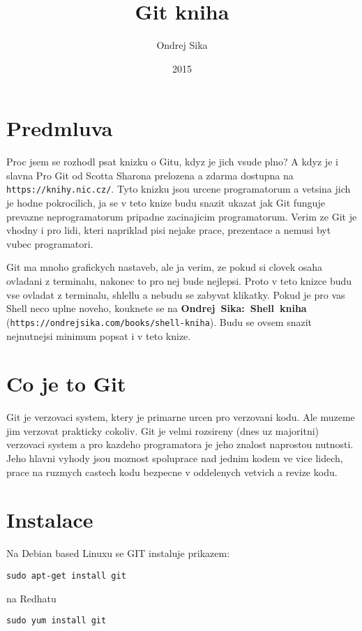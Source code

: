 \documentclass[12pt,a5paper]{article}
\title{Git kniha}
\author{Ondrej Sika}
\date{2015}
\begin{document}


\section{Predmluva}

Proc jsem se rozhodl psat knizku o Gitu, kdyz je jich vsude plno? A kdyz je i slavna Pro Git od Scotta Sharona prelozena a zdarma dostupna na \lstinline|https://knihy.nic.cz/|. Tyto knizku jsou urcene programatorum a vetsina jich je hodne pokrocilich, ja se v teto knize budu snazit ukazat jak Git funguje prevazne neprogramatorum pripadne zacinajicim programatorum. Verim ze Git je vhodny i pro lidi, kteri napriklad pisi nejake prace, prezentace a nemusi byt vubec programatori.

Git ma mnoho grafickych nastaveb, ale ja verim, ze pokud si clovek osaha ovladani z terminalu, nakonec to pro nej bude nejlepsi. Proto v teto knizce budu vse ovladat z terminalu, shlellu a nebudu se zabyvat klikatky. Pokud je pro vas Shell neco uplne noveho, kouknete se na {\bf Ondrej~Sika:~Shell~kniha} (\lstinline|https://ondrejsika.com/books/shell-kniha|). Budu se ovsem snazit nejnutnejsi minimum popsat i v teto knize.

\section{Co je to Git}

Git je verzovaci system, ktery je primarne urcen pro verzovani kodu. Ale muzeme jim verzovat prakticky cokoliv. Git je velmi rozsireny (dnes uz majoritni) verzovaci system a pro kazdeho programatora je jeho znalost naprostou nutnosti. Jeho hlavni vyhody jsou moznost spoluprace nad jednim kodem ve vice lidech, prace na ruzmych castech kodu bezpecne v oddelenych vetvich a revize kodu.

\section{Instalace}

Na Debian based Linuxu se GIT instaluje prikazem:

\begin{lstlisting}
sudo apt-get install git
\end{lstlisting}

na Redhatu

\begin{lstlisting}
sudo yum install git
\end{lstlisting}
\end{document}
